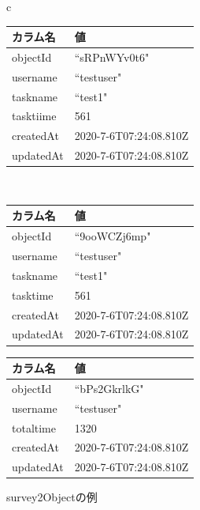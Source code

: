 \begin{figure}[htb]
\begin{center}
\begin{tabular}{c}

\begin{minipage}[htb]{\linewidth}
\begin{center}
  \begin{tabular}{|l|l|} \hline
    カラム名 & 値 \\ \hline
    objectId & ``sRPnWYv0t6" \\
    username & ``testuser" \\
    taskname & ``test1" \\
    tasktiime & 561 \\ 
    createdAt & 2020-7-6T07:24:08.810Z  \\
    updatedAt & 2020-7-6T07:24:08.810Z \\ \hline
  \end{tabular}
   \caption{tasktimeObjectの例}
  \label{tb:tasktime_object}
\end{center}
\end{minipage}

\\

\begin{minipage}[htb]{0.5\linewidth}
\begin{center}
  \caption{surveyObjectの例}
  \begin{tabular}{|l|l|} \hline
    カラム名 & 値 \\ \hline
    objectId & ``9ooWCZj6mp" \\
    username & ``testuser" \\
    taskname & ``test1" \\
    tasktime & 561 \\ 
    createdAt & 2020-7-6T07:24:08.810Z  \\
    updatedAt & 2020-7-6T07:24:08.810Z \\ \hline
  \end{tabular}
  \label{tb:survey_object}
\end{center}
\end{minipage}

\begin{minipage}[htb]{0.5\linewidth}
\begin{center}
  \caption{survey2Objectの例}
  \begin{tabular}{|l|l|} \hline
    カラム名 & 値 \\ \hline
    objectId & ``bPs2GkrlkG" \\
    username & ``testuser" \\
    totaltime & 1320 \\ 
    createdAt & 2020-7-6T07:24:08.810Z  \\
    updatedAt & 2020-7-6T07:24:08.810Z \\ \hline
  \end{tabular}
  \label{tb:survey2_object}
\end{center}
\end{minipage}
\end{tabular}
\end{center}
\end{figure}